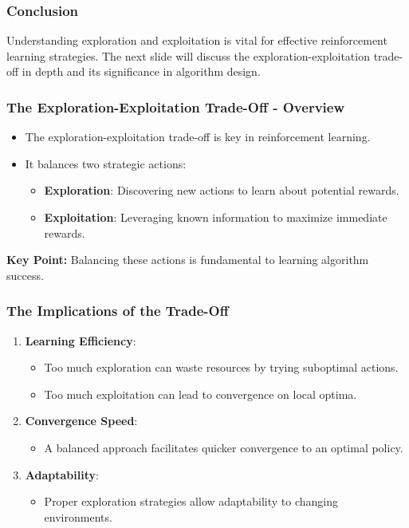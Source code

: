 \documentclass[aspectratio=169]{beamer}
\begin{document}
\begin{frame}[fragile]
    \frametitle{Conclusion}
    Understanding exploration and exploitation is vital for effective reinforcement learning strategies. The next slide will discuss the exploration-exploitation trade-off in depth and its significance in algorithm design.
\end{frame}

\begin{frame}[fragile]
    \frametitle{The Exploration-Exploitation Trade-Off - Overview}
    \begin{itemize}
        \item The exploration-exploitation trade-off is key in reinforcement learning.
        \item It balances two strategic actions:
            \begin{itemize}
                \item \textbf{Exploration}: Discovering new actions to learn about potential rewards.
                \item \textbf{Exploitation}: Leveraging known information to maximize immediate rewards.
            \end{itemize}
    \end{itemize}
    \textbf{Key Point:} Balancing these actions is fundamental to learning algorithm success.
\end{frame}

\begin{frame}[fragile]
    \frametitle{The Implications of the Trade-Off}
    \begin{enumerate}
        \item \textbf{Learning Efficiency}:
            \begin{itemize}
                \item Too much exploration can waste resources by trying suboptimal actions.
                \item Too much exploitation can lead to convergence on local optima.
            \end{itemize}
        \item \textbf{Convergence Speed}:
            \begin{itemize}
                \item A balanced approach facilitates quicker convergence to an optimal policy.
            \end{itemize}
        \item \textbf{Adaptability}:
            \begin{itemize}
                \item Proper exploration strategies allow adaptability to changing environments.
            \end{itemize}
    \end{enumerate}
\end{frame}
\end{document}
